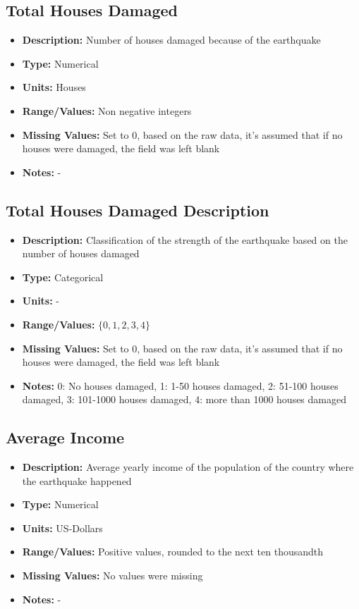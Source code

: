 \documentclass[a4paper]{article}
\begin{document}
\subsection{Total Houses Damaged}
\begin{itemize}
    \item \textbf{Description:} Number of houses damaged because of the earthquake
    \item \textbf{Type:} Numerical
    \item \textbf{Units:} Houses
    \item \textbf{Range/Values:} Non negative integers
    \item \textbf{Missing Values:} Set to 0, based on the raw data, it's assumed that if no houses were damaged, the field was left blank
    \item \textbf{Notes:} -
\end{itemize}

\subsection{Total Houses Damaged Description}
\begin{itemize}
    \item \textbf{Description:} Classification of the strength of the earthquake based on the number of houses damaged
    \item \textbf{Type:} Categorical
    \item \textbf{Units:} -
    \item \textbf{Range/Values:} $\{0,1,2,3,4 \}$
    \item \textbf{Missing Values:} Set to 0, based on the raw data, it's assumed that if no houses were damaged, the field was left blank
    \item \textbf{Notes:} 0: No houses damaged, 1: 1-50 houses damaged, 2: 51-100 houses damaged, 3: 101-1000 houses damaged, 4: more than 1000 houses damaged
\end{itemize}

\subsection{Average Income}
\begin{itemize}
    \item \textbf{Description:} Average yearly income of the population of the country where the earthquake happened
    \item \textbf{Type:} Numerical
    \item \textbf{Units:} US-Dollars
    \item \textbf{Range/Values:} Positive values, rounded to the next ten thousandth
    \item \textbf{Missing Values:} No values were missing
    \item \textbf{Notes:} -
\end{itemize}
\end{document}
